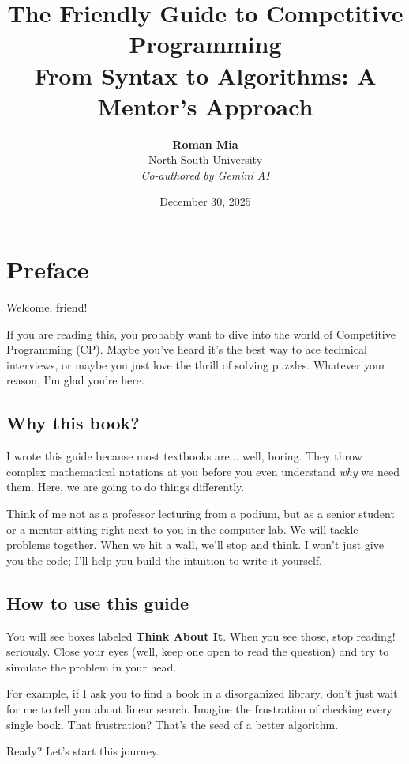 \documentclass[12pt, a4paper]{report}
\title{\textbf{The Friendly Guide to Competitive Programming}\\
\large From Syntax to Algorithms: A Mentor's Approach}
\author{\textbf{Roman Mia}\\
North South University\\
\textit{Co-authored by Gemini AI}}
\date{December 30, 2025}
\begin{document}
\maketitle

\chapter*{Preface}

Welcome, friend!

If you are reading this, you probably want to dive into the world of Competitive Programming (CP). Maybe you've heard it's the best way to ace technical interviews, or maybe you just love the thrill of solving puzzles. Whatever your reason, I'm glad you're here.

\section*{Why this book?}
I wrote this guide because most textbooks are... well, boring. They throw complex mathematical notations at you before you even understand \textit{why} we need them. Here, we are going to do things differently.

Think of me not as a professor lecturing from a podium, but as a senior student or a mentor sitting right next to you in the computer lab. We will tackle problems together. When we hit a wall, we'll stop and think. I won't just give you the code; I'll help you build the intuition to write it yourself.

\section*{How to use this guide}
You will see boxes labeled \textbf{Think About It}. When you see those, stop reading! seriously. Close your eyes (well, keep one open to read the question) and try to simulate the problem in your head. 

For example, if I ask you to find a book in a disorganized library, don't just wait for me to tell you about linear search. Imagine the frustration of checking every single book. That frustration? That's the seed of a better algorithm.

Ready? Let's start this journey.

\tableofcontents

\end{document}
